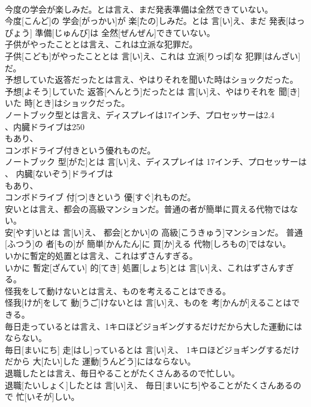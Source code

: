 \documentclass[8pt]{extreport}
\begin{document}
\begin{CJK}{UTF8}{min}
\\	今度の学会が楽しみだ。とは言え、まだ発表準備は全然できていない。	
\\	今度[こんど]の 学会[がっかい]が 楽[たの]しみだ。とは 言[い]え、まだ 発表[はっぴょう] 準備[じゅんび]は 全然[ぜんぜん]できていない。
\\	子供がやったこととは言え、これは立派な犯罪だ。	
\\	子供[こども]がやったこととは 言[い]え、これは 立派[りっぱ]な 犯罪[はんざい]だ。
\\	予想していた返答だったとは言え、やはりそれを聞いた時はショックだった。	
\\	予想[よそう]していた 返答[へんとう]だったとは 言[い]え、やはりそれを 聞[き]いた 時[とき]はショックだった。
\\	ノートブック型とは言え、ディスプレイは17インチ、プロセッサーは2.4
\\	、内臓ドライブは250
\\	もあり、
\\	コンボドライブ付きという優れものだ。	
\\	ノートブック 型[がた]とは 言[い]え、ディスプレイは 17インチ、プロセッサーは 
\\	、 内臓[ないぞう]ドライブは 
\\	もあり、 
\\	コンボドライブ 付[つ]きという 優[すぐ]れものだ。
\\	安いとは言え、都会の高級マンションだ。普通の者が簡単に買える代物ではない。	
\\	安[やす]いとは 言[い]え、 都会[とかい]の 高級[こうきゅう]マンションだ。 普通[ふつう]の 者[もの]が 簡単[かんたん]に 買[か]える 代物[しろもの]ではない。
\\	いかに暫定的処置とは言え、これはずさんすぎる。	
\\	いかに 暫定[ざんてい] 的[てき] 処置[しょち]とは 言[い]え、これはずさんすぎる。
\\	怪我をして動けないとは言え、ものを考えることはできる。	
\\	怪我[けが]をして 動[うご]けないとは 言[い]え、ものを 考[かんが]えることはできる。
\\	毎日走っているとは言え、1キロほどジョギングするだけだから大した運動にはならない。	
\\	毎日[まいにち] 走[はし]っているとは 言[い]え、 1キロほどジョギングするだけだから 大[たい]した 運動[うんどう]にはならない。
\\	退職したとは言え、毎日やることがたくさんあるので忙しい。	
\\	退職[たいしょく]したとは 言[い]え、 毎日[まいにち]やることがたくさんあるので 忙[いそが]しい。

\end{CJK}
\end{document}
